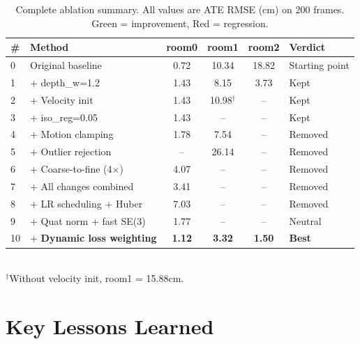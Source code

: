 \documentclass[10pt,twocolumn]{article}
\begin{document}
\begin{table}[t]
\centering
\caption{Complete ablation summary. All values are ATE RMSE (cm) on 200 frames. Green = improvement, Red = regression.}
\label{tab:summary}
\begin{tabular}{llcccl}
\toprule
\textbf{\#} & \textbf{Method} & \textbf{room0} & \textbf{room1} & \textbf{room2} & \textbf{Verdict} \\
\midrule
0 & Original baseline & 0.72 & 10.34 & 18.82 & Starting point \\
1 & + depth\_w=1.2 & 1.43 & 8.15 & 3.73 & \textcolor{improved}{Kept} \\
2 & + Velocity init & 1.43 & 10.98$^\dagger$ & -- & \textcolor{improved}{Kept} \\
3 & + iso\_reg=0.05 & 1.43 & -- & -- & \textcolor{improved}{Kept} \\
4 & + Motion clamping & 1.78 & 7.54 & -- & \textcolor{regressed}{Removed} \\
5 & + Outlier rejection & -- & 26.14 & -- & \textcolor{regressed}{Removed} \\
6 & + Coarse-to-fine (4$\times$) & 4.07 & -- & -- & \textcolor{regressed}{Removed} \\
7 & + All changes combined & 3.41 & -- & -- & \textcolor{regressed}{Removed} \\
8 & + LR scheduling + Huber & 7.03 & -- & -- & \textcolor{regressed}{Removed} \\
9 & + Quat norm + fast SE(3) & 1.77 & -- & -- & \textcolor{neutral}{Neutral} \\
10 & + \textbf{Dynamic loss weighting} & \textbf{1.12} & \textbf{3.32} & \textbf{1.50} & \textcolor{improved}{\textbf{Best}} \\
\bottomrule
\end{tabular}
\\[2pt]
{\small $^\dagger$Without velocity init, room1 = 15.88cm.}
\end{table}

\section{Key Lessons Learned}
\end{document}
